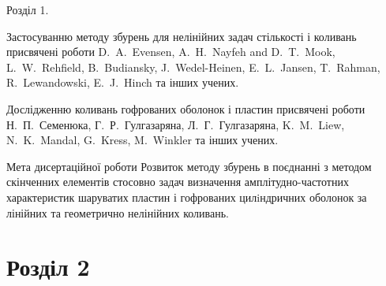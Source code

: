 \documentclass[8pt]{beamer}
\numberwithin{figure}{section}
\numberwithin{equation}{section}
\numberwithin{table}{section}
\begin{document}
\begin{frame}{Розділ 1.}



\medskip 
Застосуванню методу збурень для нелінійних задач стількості і коливань присвячені роботи D.~A.~Evensen, A.~H.~Nayfeh and D.~T.~Mook, L.~W.~Rehfield, B.~Budiansky, J.~Wedel-Heinen, E.~L.~Jansen, T.~Rahman, R.~Lewandowski, E.~J.~Hinch та інших учених.

\medskip
Дослідженню коливань гофрованих оболонок і пластин присвячені роботи Н.~П.~Семенюка, Г.~Р.~Гулгазаряна, Л.~Г.~Гулгазаряна, K.~M.~Liew, N.~K.~Mandal, G.~Kress, M.~Winkler та інших учених.

\begin{block}{Мета дисертаційної роботи}
Розвиток методу збурень в поєднанні з методом скінченних елементів стосовно задач визначення амплітудно-частотних характеристик шаруватих пластин і гофрованих цилiндричних оболонок за лінійних та геометрично нелінійних коливань.
\end{block}


\end{frame}

\section{Розділ 2}
\end{document}
